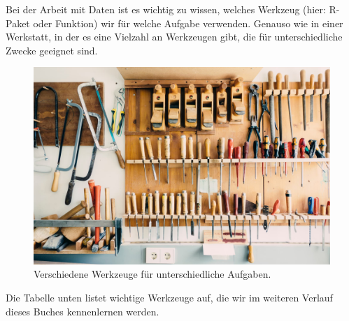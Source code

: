 \documentclass[
]{book}
\begin{document}
Bei der Arbeit mit Daten ist es wichtig zu wissen, welches Werkzeug (hier: R-Paket oder Funktion) wir für welche Aufgabe verwenden. Genauso wie in einer Werkstatt, in der es eine Vielzahl an Werkzeugen gibt, die für unterschiedliche Zwecke geeignet sind.

\begin{figure}
\includegraphics[width=1\linewidth]{fig/tool_set} \caption{Verschiedene Werkzeuge für unterschiedliche Aufgaben.}\label{fig:fig-werkzeuge}
\end{figure}

Die Tabelle unten listet wichtige Werkzeuge auf, die wir im weiteren Verlauf dieses Buches kennenlernen werden.
\end{document}

